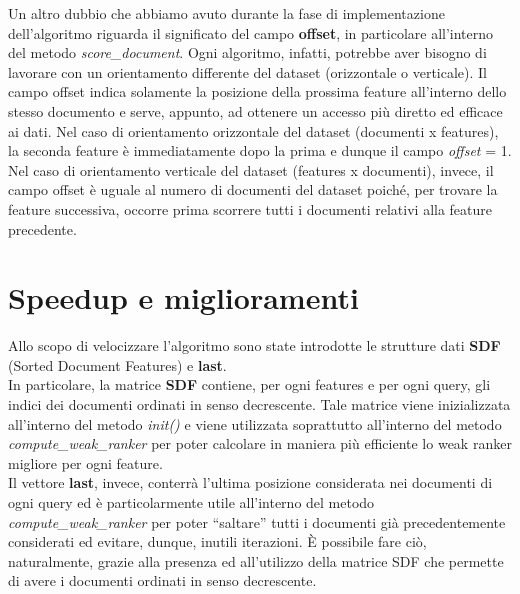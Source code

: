 Un altro dubbio che abbiamo avuto durante la fase di implementazione dell'algoritmo riguarda il significato del campo \textbf{offset}, in particolare all'interno del metodo \textit{score\_document}. Ogni algoritmo, infatti, potrebbe aver bisogno di lavorare con un orientamento differente del dataset (orizzontale o verticale). Il campo offset indica solamente la posizione della prossima feature all'interno dello stesso documento e serve, appunto, ad ottenere un accesso più diretto ed efficace ai dati. Nel caso di orientamento orizzontale del dataset (documenti x features), la seconda feature è immediatamente dopo la prima e dunque il campo \textit{offset} = 1. Nel caso di orientamento verticale del dataset (features x documenti), invece, il campo offset è uguale al numero di documenti del dataset poiché, per trovare la feature successiva, occorre prima scorrere tutti i documenti relativi alla feature precedente.\\

	\section*{Speedup e miglioramenti}
Allo scopo di velocizzare l'algoritmo sono state introdotte le strutture dati \textbf{SDF} (Sorted Document Features) e \textbf{last}.\\
In particolare, la matrice \textbf{SDF} contiene, per ogni features e per ogni query, gli indici dei documenti ordinati in senso decrescente. Tale matrice viene inizializzata all'interno del metodo \textit{init()} e viene utilizzata soprattutto all'interno del metodo \textit{compute\_weak\_ranker} per poter calcolare in maniera più efficiente lo weak ranker migliore per ogni feature.\\
Il vettore \textbf{last}, invece, conterrà l'ultima posizione considerata nei documenti di ogni query ed è particolarmente utile all'interno del metodo \textit{compute\_weak\_ranker} per poter ``saltare'' tutti i documenti già precedentemente considerati ed evitare, dunque, inutili iterazioni. È possibile fare ciò, naturalmente, grazie alla presenza ed all'utilizzo della matrice SDF che permette di avere i documenti ordinati in senso decrescente.\\



